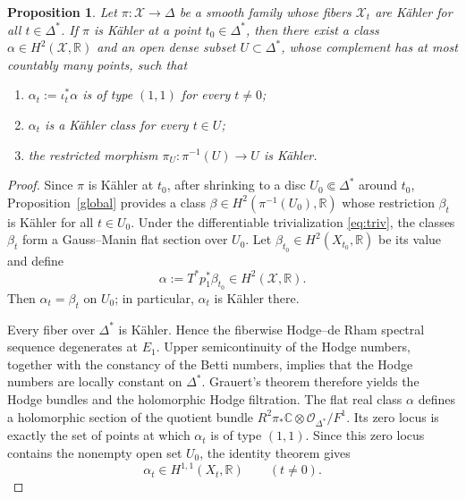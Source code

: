 \documentclass[11pt,letterpaper]{amsart}
\numberwithin{equation}{section}
\newcommand{\CC}{\mathbb{C}}
\newcommand{\RR}{\mathbb{R}}
\newcommand{\cal}{\mathcal}
\def\cX{{\cal X}}
\newtheorem{prop}{Proposition}[section]
\begin{document}
\begin{prop}\label{res1}
Let $\pi:\mathcal X\to\Delta$ be a smooth family whose fibers $\cX_t$ are
K\"ahler for all $t\in\Delta^*$. If $\pi$ is K\"ahler at a point
$t_0\in\Delta^*$, then there exist a class $\alpha\in H^2(\cX,\RR)$ and an
open dense subset $U\subset\Delta^*$, whose complement has at most countably
many points, such that
\begin{enumerate}
\item $\alpha_t:=\iota_t^*\alpha$ is of type $(1,1)$ for every $t\ne0$;
\item $\alpha_t$ is a K\"ahler class for every $t\in U$;
\item the restricted morphism $\pi_U:\pi^{-1}(U)\to U$ is K\"ahler.
\end{enumerate}
\end{prop}
\begin{proof}
Since $\pi$ is K\"ahler at $t_0$, after shrinking to a disc
$U_0\Subset\Delta^*$ around $t_0$, Proposition~\ref{global} provides a class
$\beta\in H^2(\pi^{-1}(U_0),\RR)$ whose restriction $\beta_t$ is K\"ahler for
all $t\in U_0$. Under the differentiable trivialization \eqref{eq:triv}, the
classes $\beta_t$ form a Gauss--Manin flat section over $U_0$. Let
$\beta_{t_0}\in H^2(X_{t_0},\RR)$ be its value and define
\[
 \alpha:=T^*p_1^*\beta_{t_0}\in H^2(\cX,\RR).
\]
Then $\alpha_t=\beta_t$ on $U_0$; in particular, $\alpha_t$ is K\"ahler there.

Every fiber over $\Delta^*$ is K\"ahler. Hence the fiberwise Hodge--de Rham
spectral sequence degenerates at $E_1$. Upper semicontinuity of the Hodge
numbers, together with the constancy of the Betti numbers, implies that the
Hodge numbers are locally constant on $\Delta^*$. Grauert's theorem therefore yields the Hodge bundles and the holomorphic Hodge filtration. The flat real
class $\alpha$ defines a holomorphic section of the quotient bundle
$R^2\pi_*\CC\otimes\mathcal O_{\Delta^*}/F^1$. Its zero locus is exactly the
set of points at which $\alpha_t$ is of type $(1,1)$. Since this zero locus contains the nonempty open set $U_0$, the identity theorem gives
\begin{equation}\label{eq:alpha-H11-punctured}
 \alpha_t\in H^{1,1}(X_t,\RR)\qquad(t\ne0).
\end{equation}


\end{proof}
\end{document}
